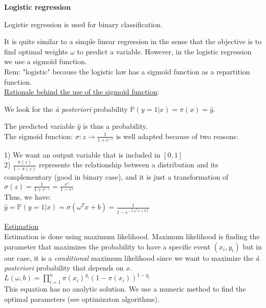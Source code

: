 {\fontsize{12pt}{22pt} \textbf{Logistic regression}\par}

\vspace{5mm}

Logistic regression is used for binary classification.

It is quite similar to a simple linear regression in the sense that the objective is to find optimal weights $\omega$ to predict a variable. However, in the logistic regression we use a sigmoïd function.\\

Rem: "logistic" because the logistic law has a sigmoïd function as a repartition function.\\

\underline{Rationale behind the use of the sigmoïd function}:

We look for the \textit{à posteriori} probability $\mathbb{P}(y=1 | x) = \pi (x) = \hat{y}$.

The predicted variable $\hat{y}$ is thus a probability.  \\

The sigmoïd function: $\sigma: z \to \frac{1}{1+e^{-z}}$ is well adapted because of two reasons:

1) We want an output variable that is included in $[0,1]$ \\
2) $\frac{\pi(z)}{1-\pi(z)}$ represents the relationship between a distribution and its complementary (good in binary case), and it is just a transformation of $\sigma(z)=\frac{1}{1+e^{-z}}=\frac{e^z}{1-e^z}$ \\

Thus, we have: \\
$\hat{y} = \mathbb{P}(y=1 | x) = \sigma(\omega ^Tx + b) = \frac{1}{1-e^{-(\omega ^Tx + b)}}$

\vspace{5mm}

\underline{Estimation} \\
Estimation is done using maximum likelihood. Maximum likelihood is finding the parameter that maximizes the probability to have a specific event $(x_i, y_i)$ but in our case, it is a \textit{conditional} maximum likelihood since we want to maximize the \textit{à posteriori} probability that depends on $x$. \\

$L(\omega, b) = \prod_{i=1}^n \pi(x_i)^{y_i}(1-\pi(x_i))^{1-y_i}$ \\

This equation has no analytic solution. We use a numeric method to find the optimal parameters (see optimizaton algorithms).

\vspace{5mm}